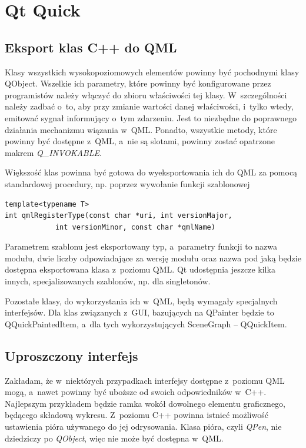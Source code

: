 \section{Qt Quick}

\subsection{Eksport klas C++ do QML}
Klasy wszystkich wysokopoziomowych elementów powinny być pochodnymi klasy QObject. Wszelkie ich parametry, które powinny być konfigurowane przez programistów należy włączyć do zbioru właściwości tej klasy. W~szczególności należy zadbać o~to, aby przy zmianie wartości danej właściwości, i~tylko wtedy, emitować sygnał informujący o~tym zdarzeniu. Jest to niezbędne do poprawnego działania mechanizmu wiązania w~QML. Ponadto, wszystkie metody, które powinny być dostępne z~QML, a~nie są slotami, powinny zostać opatrzone makrem \textit{Q\_INVOKABLE}.

Większość klas powinna być gotowa do wyeksportowania ich do QML za pomocą standardowej procedury, np. poprzez wywołanie funkcji szablonowej
\begin{lstlisting}
template<typename T>
int qmlRegisterType(const char *uri, int versionMajor, 
		    int versionMinor, const char *qmlName)
\end{lstlisting}
Parametrem szablonu jest eksportowany typ, a~parametry funkcji to nazwa modułu, dwie liczby odpowiadające za wersję modułu oraz nazwa pod jaką będzie dostępna eksportowana klasa z~poziomu QML. Qt udostępnia jeszcze kilka innych, specjalizowanych szablonów, np. dla singletonów.

Pozostałe klasy, do wykorzystania ich w~QML, będą wymagały specjalnych interfejsów. Dla klas związanych z~GUI, bazujących na QPainter będzie to QQuickPaintedItem, a~dla tych wykorzystujących SceneGraph -- QQuickItem.

\subsection{Uproszczony interfejs}
Zakładam, że w~niektórych przypadkach interfejsy dostępne z~poziomu QML mogą, a~nawet powinny być uboższe od swoich odpowiedników w~C++. Najlepszym przykładem będzie ramka wokół dowolnego elementu graficznego, będącego składową wykresu. Z~poziomu C++ powinna istnieć możliwość ustawienia pióra używanego do jej odrysowania. Klasa pióra, czyli \textit{QPen}, nie dziedziczy po \textit{QObject}, więc nie może być dostępna w~QML.


